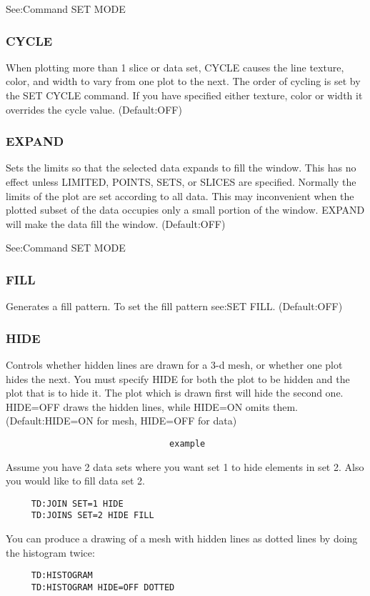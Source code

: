 See:Command SET MODE 
\subsubsection{CYCLE}
When  plotting  more  than  1  slice or data set, CYCLE causes the line
texture, color, and width to vary from one plot to the next.  The order
of  cycling  is  set  by  the SET CYCLE command.  If you have specified
either texture, color or width it overrides the cycle value.  
(Default:OFF) 
\subsubsection{EXPAND}
Sets  the  limits so that the selected data expands to fill the window.
This has  no  effect  unless  LIMITED,  POINTS,  SETS,  or  SLICES  are
specified.   Normally  the  limits of the plot are set according to all
data.  This may inconvenient  when  the  plotted  subset  of  the  data
occupies only a small portion of the window.  EXPAND will make the data
fill the window.  
(Default:OFF) 

See:Command SET MODE 
\subsubsection{FILL}
Generates a fill pattern.  To set the fill pattern see:SET FILL.  
(Default:OFF) 
\subsubsection{HIDE}
Controls  whether hidden lines are drawn for a 3-d mesh, or whether one
plot hides the next.  You must specify HIDE for both  the  plot  to  be
hidden  and the plot that is to hide it.  The plot which is drawn first
will hide the second one.   HIDE=OFF  draws  the  hidden  lines,  while
HIDE=ON omits them.  
(Default:HIDE=ON for mesh, HIDE=OFF for data) 

\begin{verbatim}
                                example
\end{verbatim}
Assume  you  have  2 data sets where you want set 1 to hide elements in
set 2.  Also you would like to fill data set 2.  
\begin{verbatim}
     TD:JOIN SET=1 HIDE 
     TD:JOINS SET=2 HIDE FILL 
\end{verbatim}

You  can  produce a drawing of a mesh with hidden lines as dotted lines
by doing the histogram twice:  
\begin{verbatim}
     TD:HISTOGRAM 
     TD:HISTOGRAM HIDE=OFF DOTTED 
\end{verbatim}
